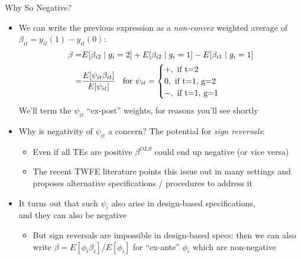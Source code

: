 \documentclass[11pt,english]{beamer}
\begin{document}
\begin{frame}{Why So Negative?}

\begin{itemize}
\item We can write the previous expression as a \emph{non-convex} weighted average of $\beta_{it}=y_{it}(1)-y_{it}(0)$:
\begin{align*}
\beta=&E[\beta_{i2}\mid g_i=2] + E[\beta_{i2} \mid g_i=1] -  E[\beta_{i1}\mid g_i=1]\\ 
=& \frac{E[\psi_{it}\beta_{it}]}{E[\psi_{it}]}\hspace{0.2cm}\text{ for }\psi_{it}=
\begin{cases}
+, \text{ if }$t=2$\\
0, \text{ if }$t=1, g=2$\\
-, \text{ if }$t=1, g=1$\\
\end{cases}
\end{align*}\pause{}
We'll term the $\psi_{it}$ ``ex-post'' weights, for reasons you'll see shortly\medskip\pause{}
\item Why is negativity of $\psi_{it}$ a concern? The potential for \emph{sign reversals}:\smallskip
\begin{itemize}
\item Even if all TEs are positive $\beta^{OLS}$ could end up negative (or vice versa) \smallskip\pause{}
\item The recent TWFE literature points this issue out in many settings and proposes alternative specifications / procedures to address it
\end{itemize}\medskip\pause{}
\item It turns out that such $\psi_i$ also arise in design-based specifications, \\ and they can also be negative\smallskip
\begin{itemize}
\item But sign reversals are impossible in design-based specs: then we can also write $\beta=E[\phi_i\beta_i]/E[\phi_i]$ for ``ex-ante'' $\phi_i$ which are non-negative
\end{itemize}
\end{itemize}

\end{frame}
\end{document}
